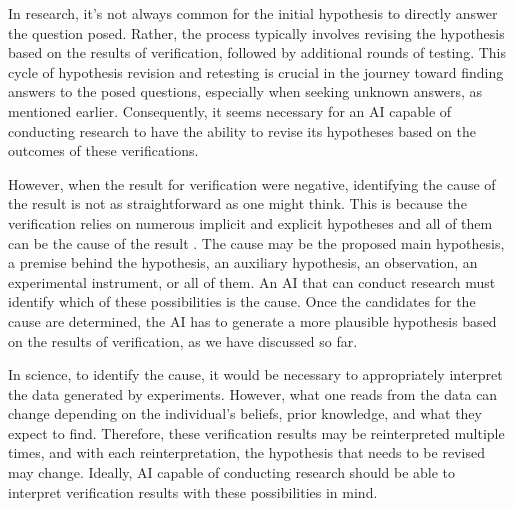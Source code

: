 In research, it's not always common for the initial hypothesis to directly answer the question posed. Rather, the process typically involves revising the hypothesis based on the results of verification, followed by additional rounds of testing. This cycle of hypothesis revision and retesting is crucial in the journey toward finding answers to the posed questions, especially when seeking unknown answers, as mentioned earlier. Consequently, it seems necessary for an AI capable of conducting research to have the ability to revise its hypotheses based on the outcomes of these verifications.

However, when the result for verification were negative, identifying the cause of the result is not as straightforward as one might think. This is because the verification relies on numerous implicit and explicit hypotheses and all of them can be the cause of the result \cite{sep-scientific-underdetermination}. The cause may be the proposed main hypothesis, a premise behind the hypothesis, an auxiliary hypothesis, an observation, an experimental instrument, or all of them. An AI that can conduct research must identify which of these possibilities is the cause. Once the candidates for the cause are determined, the AI has to generate a more plausible hypothesis based on the results of verification, as we have discussed so far.

In science, to identify the cause, it would be necessary to appropriately interpret the data generated by experiments. However, what one reads from the data can change depending on the individual's beliefs, prior knowledge, and what they expect to find. Therefore, these verification results may be reinterpreted multiple times, and with each reinterpretation, the hypothesis that needs to be revised may change. Ideally, AI capable of conducting research should be able to interpret verification results with these possibilities in mind.


